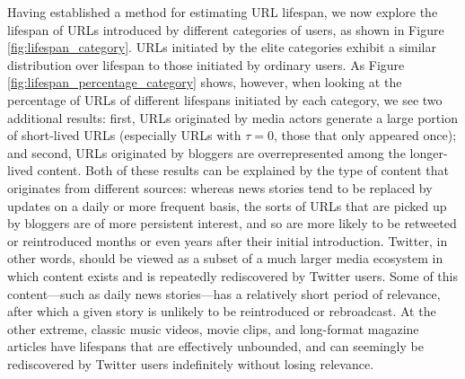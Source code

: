 \documentclass[phd,tocprelim]{cornell}
\begin{document}
Having established a method for estimating URL lifespan, we
now explore the lifespan of URLs introduced by different categories of
users, as shown in Figure \ref{fig:lifespan_category}.
%
URLs initiated by the elite categories exhibit a similar distribution over
lifespan to those initiated by ordinary users. As Figure
\ref{fig:lifespan_percentage_category} shows, however, when looking at the
percentage of URLs of different lifespans initiated by each category, we
see two additional results: first, URLs originated by media actors generate
a large portion of short-lived URLs (especially URLs with $\tau=0$, those
that only appeared once); and second, URLs originated by bloggers are
overrepresented among the longer-lived content.  Both of these results can
be explained by the type of content that originates from different sources:
whereas news stories tend to be replaced by updates on a daily or more
frequent basis, the sorts of URLs that are picked up by bloggers are of
more persistent interest, and so are more likely to be retweeted or
reintroduced months or even years after their initial introduction.
Twitter, in other words, should be viewed as a subset of a much larger
media ecosystem in which content exists and is repeatedly rediscovered by
Twitter users. Some of this content---such as daily news stories---has a
relatively short period of relevance, after which a given story is unlikely
to be reintroduced or rebroadcast. At the other extreme, classic music
videos, movie clips, and long-format magazine articles have lifespans that
are effectively unbounded, and can seemingly be rediscovered by Twitter
users indefinitely without losing relevance.
\end{document}
